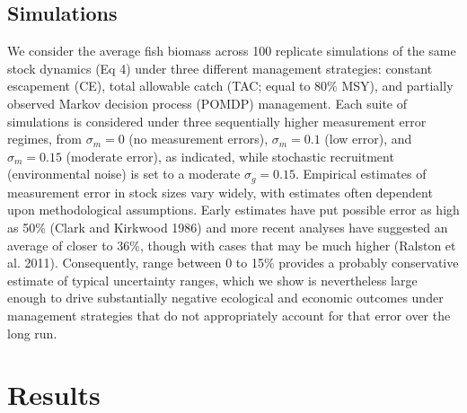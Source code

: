 \documentclass[3p]{elsarticle} %
\begin{document}
\hypertarget{simulations}{%
\subsection{Simulations}\label{simulations}}

We consider the average fish biomass across 100 replicate simulations of
the same stock dynamics (Eq 4) under three different management
strategies: constant escapement (CE), total allowable catch (TAC; equal
to 80\% MSY), and partially observed Markov decision process (POMDP)
management. Each suite of simulations is considered under three
sequentially higher measurement error regimes, from \(\sigma_m = 0\) (no
measurement errors), \(\sigma_m = 0.1\) (low error), and
\(\sigma_m = 0.15\) (moderate error), as indicated, while stochastic
recruitment (environmental noise) is set to a moderate
\(\sigma_g = 0.15\). Empirical estimates of measurement error in stock
sizes vary widely, with estimates often dependent upon methodological
assumptions. Early estimates have put possible error as high as 50\%
(Clark and Kirkwood 1986) and more recent analyses have suggested an
average of closer to 36\%, though with cases that may be much higher
(Ralston et al. 2011). Consequently, range between 0 to 15\% provides a
probably conservative estimate of typical uncertainty ranges, which we
show is nevertheless large enough to drive substantially negative
ecological and economic outcomes under management strategies that do not
appropriately account for that error over the long run.

\hypertarget{results}{%
\section{Results}\label{results}}
\end{document}

